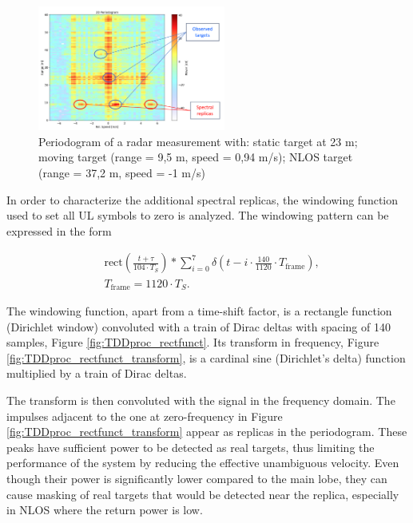     \begin{figure}[H]
        \centering
        \includegraphics[width=0.55\textwidth]{Images/TDDprocessing/SpectralReplicasDLULpattern.png}
        \caption{Periodogram of a radar measurement with: static target at 23 m; moving target (range = 9,5 m, speed = 0,94 m/s); NLOS target (range = 37,2 m, speed = -1 m/s)}
        \label{fig:SpectralReplicasDLULpattern}
    \end{figure}
    
    In order to characterize the additional spectral replicas, the windowing function used to set all UL symbols to zero is analyzed. The windowing pattern can be expressed in the form
    
    \begin{align}
        &\text{rect}\left( \frac{t + \tau}{104 \cdot T_S}\right) \ast \sum_{i=0}^7 \delta\left( t - i\cdot \frac{140}{1120}\cdot T_{\text{frame}} \right),  \\
        &T_{\text{frame}} = 1120 \cdot T_S.
    \end{align}

    The windowing function, apart from a time-shift factor, is a rectangle function (Dirichlet window) convoluted with a train of Dirac deltas with spacing of 140 samples, Figure \ref{fig:TDDproc_rectfunct}. Its transform in frequency, Figure \ref{fig:TDDproc_rectfunct_transform}, is a cardinal sine (Dirichlet's delta) function multiplied by a train of Dirac deltas.

    The transform is then convoluted with the signal in the frequency domain. The impulses adjacent to the one at zero-frequency in Figure \ref{fig:TDDproc_rectfunct_transform} appear as replicas in the periodogram. These peaks have sufficient power to be detected as real targets, thus limiting the performance of the system by reducing the effective unambiguous velocity. Even though their power is significantly lower compared to the main lobe, they can cause masking of real targets that would be detected near the replica, especially in NLOS where the return power is low. 

